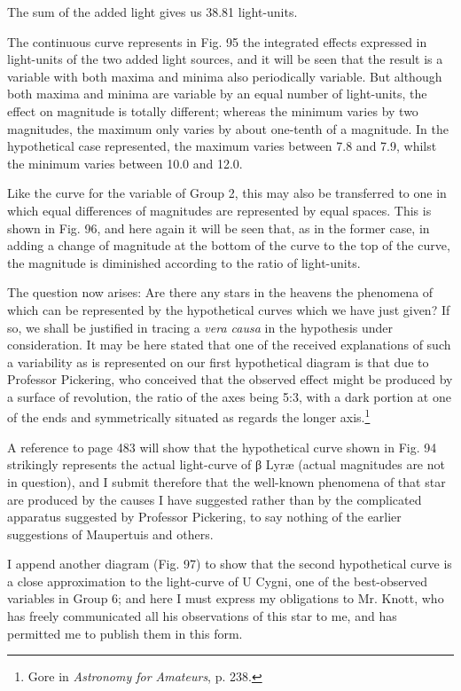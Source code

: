 \documentclass[a4paper, 12pt, oneside, polutonikogreek, english]{article}
\begin{document}
The sum of the added light gives us 38.81 light-units.

The continuous curve represents in Fig. 95 the integrated effects expressed in light-units of the two added light sources, and it will be seen that the result is a variable with both maxima and minima also periodically variable. But although both maxima and minima are variable by an equal number of light-units, the effect on magnitude is totally different; whereas the minimum varies by two magnitudes, the maximum only varies by about one-tenth of a magnitude. In the hypothetical case represented, the maximum varies between 7.8 and 7.9, whilst the minimum varies between 10.0 and 12.0.

Like the curve for the variable of Group 2, this may also be transferred to one in which equal differences of magnitudes are represented by equal spaces. This is shown in Fig. 96, and here again it will be seen that, as in the former case, in adding a change of magnitude at the bottom of the curve to the top of the curve, the magnitude is diminished according to the ratio of light-units.

The question now arises: Are there any stars in the heavens the phenomena of which can be represented by the hypothetical curves which we have just given? If so, we shall be justified in tracing a \emph{vera causa} in the hypothesis under consideration. It may be here stated that one of the received explanations of such a variability as is represented on our first hypothetical diagram is that due to Professor Pickering, who conceived that the observed effect might be produced by a surface of revolution, the ratio of the axes being 5:3, with a dark portion at one of the ends and symmetrically situated as regards the longer axis.\footnote{Gore in \emph{Astronomy for Amateurs}, p. 238.}

A reference to page 483 will show that the hypothetical curve shown in Fig. 94 strikingly represents the actual light-curve of β Lyræ (actual magnitudes are not in question), and I submit therefore that the well-known phenomena of that star are produced by the causes I have suggested rather than by the complicated apparatus suggested by Professor Pickering, to say nothing of the earlier suggestions of Maupertuis and others.

I append another diagram (Fig. 97) to show that the second hypothetical curve is a close approximation to the light-curve of U Cygni, one of the best-observed variables in Group 6; and here I must express my obligations to Mr. Knott, who has freely communicated all his observations of this star to me, and has permitted me to publish them in this form.
\end{document}

